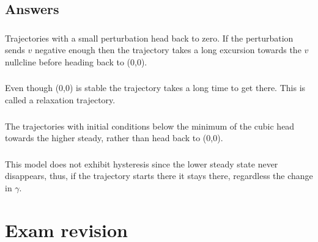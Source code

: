 \documentclass[]{article}
\begin{document}
\begin{Answ}
\subsection{Answers}
\subsubsection{}
Trajectories with a small perturbation head back to zero. If the perturbation sends $v$ negative enough then the trajectory takes a long excursion towards the $v$ nullcline before heading back to (0,0).
\subsubsection{}
Even though (0,0) is stable the trajectory takes a long time to get there. This is called a relaxation trajectory.
\subsubsection{}
The trajectories with initial conditions below the minimum of the cubic head towards the higher steady, rather than head back to (0,0).

\subsubsection{}
This model does not exhibit hysteresis since the lower steady state never disappears, thus, if the trajectory starts there it stays there, regardless the change in $\gamma$.
\end{Answ}
\section*{Exam revision}
\end{document}

